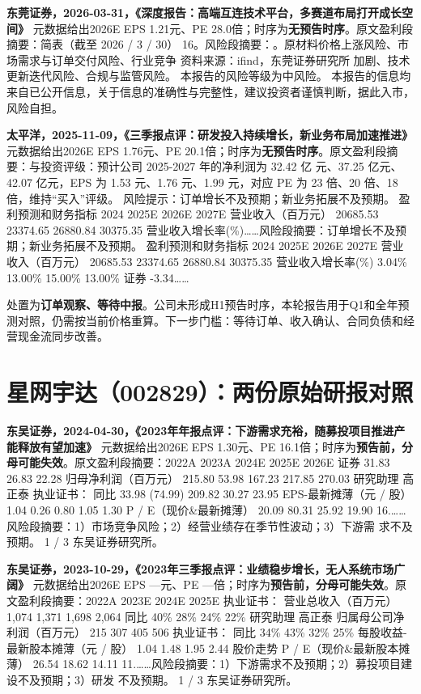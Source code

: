 \textbf{东莞证券，2026-03-31，《深度报告：高端互连技术平台，多赛道布局打开成长空间》}
元数据给出2026E EPS 1.21元、PE 28.0倍；时序为\textbf{无预告时序}。原文盈利段摘要：简表（截至 2026 / 3 / 30） 16。风险段摘要：。原材料价格上涨风险、市场需求与订单交付风险、行业竞争 资料来源：ifind，东莞证券研究所 加剧、技术更新迭代风险、合规与监管风险。 本报告的风险等级为中风险。 本报告的信息均来自已公开信息，关于信息的准确性与完整性，建议投资者谨慎判断，据此入市，风险自担。

\textbf{太平洋，2025-11-09，《三季报点评：研发投入持续增长，新业务布局加速推进》}
元数据给出2026E EPS 1.76元、PE 20.1倍；时序为\textbf{无预告时序}。原文盈利段摘要：与投资评级：预计公司 2025-2027 年的净利润为 32.42 亿 元、37.25 亿元、42.07 亿元，EPS 为 1.53 元、1.76 元、1.99 元，对应 PE 为 23 倍、20 倍、18 倍，维持“买入”评级。 风险提示：订单增长不及预期；新业务拓展不及预期。 盈利预测和财务指标 2024 2025E 2026E 2027E 营业收入（百万元） 20685.53 23374.65 26880.84 30375.35 营业收入增长率(\%)……风险段摘要：订单增长不及预期；新业务拓展不及预期。 盈利预测和财务指标 2024 2025E 2026E 2027E 营业收入（百万元） 20685.53 23374.65 26880.84 30375.35 营业收入增长率(\%) 3.04\% 13.00\% 15.00\% 13.00\% 证券 -3.34……

\begin{keyinsight}[AStock处理]
处置为\textbf{订单观察、等待中报}。公司未形成H1预告时序，本轮报告用于Q1和全年预测对照，仍需按当前价格重算。下一步门槛：等待订单、收入确认、合同负债和经营现金流同步改善。
\end{keyinsight}

\section{星网宇达（002829）：两份原始研报对照}

\textbf{东吴证券，2024-04-30，《2023年年报点评：下游需求充裕，随募投项目推进产能释放有望加速》}
元数据给出2026E EPS 1.30元、PE 16.1倍；时序为\textbf{预告前，分母可能失效}。原文盈利段摘要：2022A 2023A 2024E 2025E 2026E 证券 31.83 26.83 22.28 归母净利润（百万元） 215.80 53.98 167.23 217.85 270.03 研究助理 高正泰 执业证书： 同比 33.98 (74.99) 209.82 30.27 23.95 EPS-最新摊薄（元 / 股） 1.04 0.26 0.80 1.05 1.30 P / E（现价\&最新摊薄） 20.09 80.31 25.92 19.90 16.……风险段摘要：1）市场竞争风险；2）经营业绩存在季节性波动；3）下游需 求不及预期。 1 / 3 东吴证券研究所。

\textbf{东吴证券，2023-10-29，《2023年三季报点评：业绩稳步增长，无人系统市场广阔》}
元数据给出2026E EPS ---元、PE ---倍；时序为\textbf{预告前，分母可能失效}。原文盈利段摘要：2022A 2023E 2024E 2025E 执业证书： 营业总收入（百万元） 1,074 1,371 1,698 2,064 同比 40\% 28\% 24\% 22\% 研究助理 高正泰 归属母公司净利润（百万元） 215 307 405 506 执业证书： 同比 34\% 43\% 32\% 25\% 每股收益-最新股本摊薄（元 / 股） 1.04 1.48 1.95 2.44 股价走势 P / E（现价\&最新股本摊薄） 26.54 18.62 14.11 11.……风险段摘要：1）下游需求不及预期；2）募投项目建设不及预期；3）研发 不及预期。 1 / 3 东吴证券研究所。

